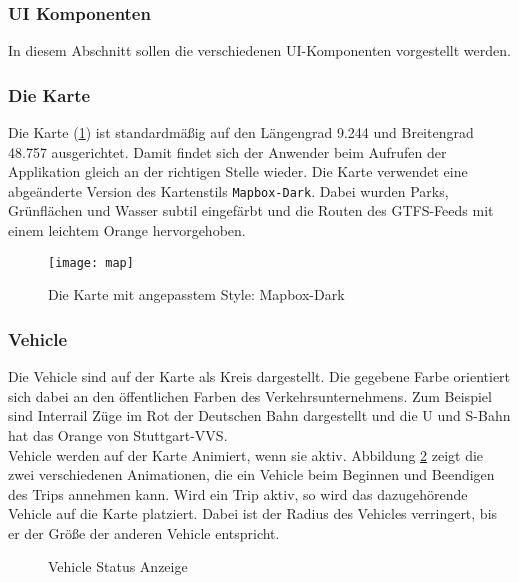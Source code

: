 \subsubsection{UI Komponenten}
\label{ssub:ui_komponenten}

  In diesem Abschnitt sollen die verschiedenen UI-Komponenten vorgestellt werden.

  \subsubsection*{Die Karte}
  \label{ssub:die_karte}
    Die Karte (\ref{fig:map}) ist standardmäßig auf den Längengrad 9.244 und Breitengrad 48.757 ausgerichtet. Damit findet sich der Anwender beim Aufrufen der Applikation gleich an der richtigen Stelle wieder. Die Karte verwendet eine abgeänderte Version des Kartenstils \texttt{Mapbox-Dark}. Dabei wurden Parks, Grünflächen und Wasser subtil eingefärbt und die Routen des GTFS-Feeds mit einem leichtem Orange hervorgehoben.

    \begin{figure}[htbp]
      \begin{center}
        \texttt{[image: map]}
        \caption{Die Karte mit angepasstem Style: Mapbox-Dark}
        \label{fig:map}
      \end{center}
    \end{figure}
    

  \subsubsection*{Vehicle}
  \label{ssub:vehicle}
    Die Vehicle sind auf der Karte als Kreis dargestellt. Die gegebene Farbe orientiert sich dabei an den öffentlichen Farben des Verkehrsunternehmens. Zum Beispiel sind Interrail Züge im Rot der Deutschen Bahn dargestellt und die U und S-Bahn hat das Orange von Stuttgart-VVS.\\

    Vehicle werden auf der Karte Animiert, wenn sie aktiv. Abbildung \ref{fig:vehicle_states} zeigt die zwei verschiedenen Animationen, die ein Vehicle beim Beginnen und Beendigen des Trips annehmen kann. Wird ein Trip aktiv, so wird das dazugehörende Vehicle auf die Karte platziert. Dabei ist der Radius des Vehicles verringert, bis er der Größe der anderen Vehicle entspricht.

    \begin{figure}[htbp]
      \centering
      \hfill
      \caption{Vehicle Status Anzeige}
      \label{fig:vehicle_states}
    \end{figure}

